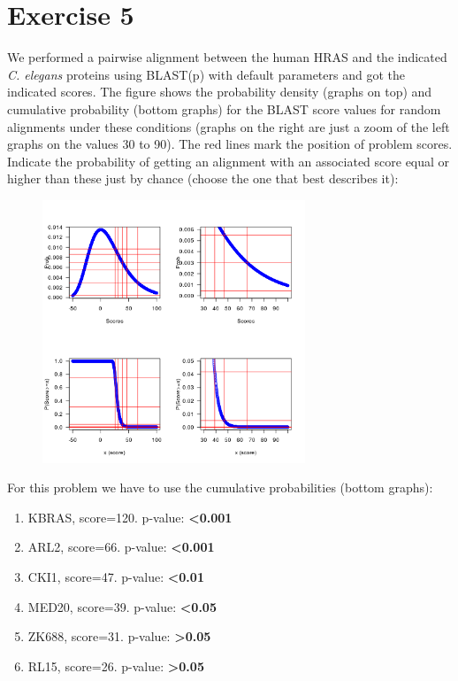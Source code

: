 \section{Exercise 5}
We performed a pairwise alignment between the human HRAS and the indicated \textit{C. elegans} proteins using BLAST(p) with default parameters and got the indicated scores. The figure shows the probability density (graphs on top) and cumulative probability (bottom graphs) for the BLAST score values for random alignments under these conditions (graphs on the right are just a zoom of the left graphs on the values 30 to 90). The red lines mark the position of problem scores. Indicate the probability of getting an alignment with an associated score equal or higher than these just by chance (choose the one that best describes it):

\begin{figure}[htbp]
\centering
\includegraphics[width = 0.7\textwidth]{figs/exam-ex5.png}
\end{figure}

For this problem we have to use the cumulative probabilities (bottom graphs):
\begin{enumerate}
\item  KBRAS, score=120. p-value: \textbf{<0.001}
\item ARL2, score=66. p-value: \textbf{<0.001}
\item CKI1, score=47. p-value: \textbf{<0.01}
\item MED20, score=39. p-value: \textbf{<0.05}
\item ZK688, score=31. p-value: \textbf{>0.05}
\item RL15, score=26. p-value: \textbf{>0.05}
\end{enumerate}

